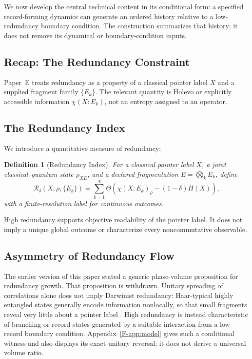 \documentclass[12pt,a4paper,openany]{book}
\newtheorem{definition}[theorem]{Definition}
\begin{document}
We now develop the central technical content in its conditional form: a specified record-forming dynamics can generate an ordered history relative to a low-redundancy boundary condition.  The construction summarizes that history; it does not remove its dynamical or boundary-condition inputs.

\subsection{Recap: The Redundancy Constraint}

Paper~E \cite{Liu2026PaperE} treats redundancy as a property of a classical pointer label $X$ and a supplied fragment family $\{E_k\}$.  The relevant quantity is Holevo or explicitly accessible information $\chi(X:E_k)$, not an entropy assigned to an operator.

\subsection{The Redundancy Index}

We introduce a quantitative measure of redundancy:

\begin{definition}[Redundancy Index]
\label{F-def:redundancy}
For a classical pointer label $X$, a joint classical--quantum state $\rho_{XE}$, and a declared fragmentation $E=\bigotimes_kE_k$, define
\begin{equation}
\mathcal{R}_\delta(X;\rho,\{E_k\})
=\sum_{k=1}^{N}\Theta\!\left(
\chi(X:E_k)_\rho-(1-\delta)H(X)\right),
\end{equation}
with a finite-resolution label for continuous outcomes.
\end{definition}

High redundancy supports objective readability of the pointer label.  It does not imply a unique global outcome or characterize every noncommutative observable.

\subsection{Asymmetry of Redundancy Flow}

The earlier version of this paper stated a generic phase-volume proposition for redundancy growth.  That proposition is withdrawn.  Unitary spreading of correlations alone does not imply Darwinist redundancy: Haar-typical highly entangled states generally encode information nonlocally, so that small fragments reveal very little about a pointer label \cite{Page1993,HaydenPreskill2007}.  High redundancy is instead characteristic of branching or record states generated by a suitable interaction from a low-record boundary condition.  Appendix~\ref{F-app:model} gives such a conditional witness and also displays its exact unitary reversal; it does not derive a universal volume ratio.
\end{document}
